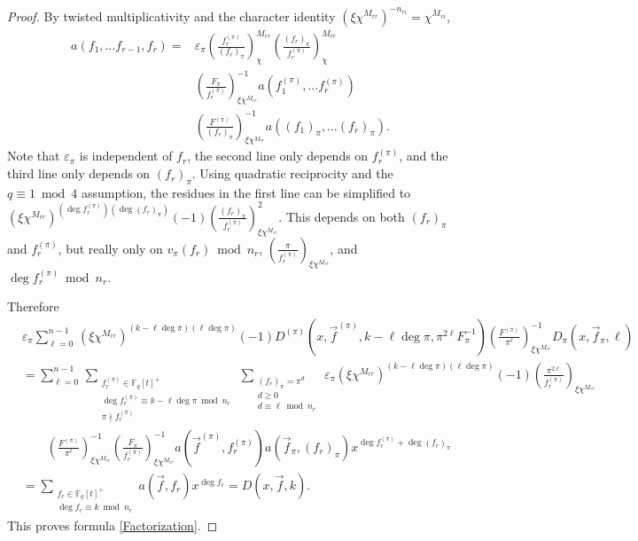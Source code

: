 \documentclass[11pt,letterpaper]{article}
\theoremstyle{definition}
\theoremstyle{remark}
\numberwithin{equation}{section}
\theoremstyle{dotless}
\newcommand{\F}{\mathbb{F}}
\newcommand{\res}[2]{\left(\frac{#1}{#2}\right)}
\begin{document}
\begin{proof}
By twisted multiplicativity and the character identity $(\xi \chi^{M_{rr}})^{-n_{ri}} = \chi^{M_{ri}}$, 
\begin{equation} \label{RemovePrime}
\begin{split}
a(f_1, \ldots f_{r-1}, f_r) = & \varepsilon_\pi \res{f_r^{(\pi)}}{(f_r)_\pi}_{\chi}^{M_{rr}}\res{(f_r)_\pi}{f_r^{(\pi)}}_{\chi}^{M_{rr}} \\
&\res{F_\pi}{f_r^{(\pi)}}_{\xi \chi^{M_{rr}}}^{-1} a(f_1^{(\pi)}, \ldots f_r^{(\pi)}) \\
& \res{F^{(\pi)}}{(f_r)_\pi}_{\xi \chi^{M_{rr}}}^{-1} a((f_1)_\pi, \ldots (f_r)_\pi).
\end{split}
\end{equation}
Note that $\varepsilon_\pi$ is independent of $f_r$, the second line only depends on $f_r^{(\pi)}$, and the third line only depends on $(f_r)_\pi$. Using quadratic reciprocity and the $q \equiv 1 \bmod 4$ assumption, the residues in the first line can be simplified to $(\xi \chi^{M_{rr}})^{(\deg f_r^{(\pi)})(\deg (f_r)_\pi)}(-1) \res{(f_r)_\pi}{f_r^{(\pi)}}^2_{\xi \chi^{M_{rr}}}$. This depends on both $(f_r)_\pi$ and $f_r^{(\pi)}$, but really only on $v_{\pi}(f_r) \bmod n_r$, $\res{\pi}{f_r^{(\pi)}}_{\xi \chi^{M_{rr}}}$, and $\deg f_r^{(\pi)} \bmod n_r$.

Therefore 
\begin{equation*}
\begin{split}
&\varepsilon_\pi \sum_{\ell=0}^{n-1} \, (\xi \chi^{M_{rr}})^{(k-\ell\deg \pi)(\ell \deg \pi)} (-1) D^{(\pi)}(x, \vec{f}^{(\pi)}, k-\ell \deg \pi, \pi^{2 \ell} F_\pi^{-1}) \res{F^{(\pi)}}{\pi^\ell}_{\xi \chi^{M_{rr}}}^{-1} D_\pi(x, \vec{f}_\pi, \ell) \\
& =\sum_{\ell=0}^{n-1} \, \sum_{\substack{ f_r^{(\pi)} \in \F_q[t]^+ \\ \deg f_r^{(\pi)} \equiv k-\ell \deg \pi \bmod n_r \\ \pi \nmid f_r^{(\pi)}}} \, \sum_{\substack{(f_r)_\pi = \pi^d \\ d\geq 0 \\ d \equiv \ell \bmod n_r}} \, \varepsilon_\pi (\xi \chi^{M_{rr}})^{(k-\ell\deg \pi)(\ell \deg \pi)} (-1) \res{\pi^{2\ell}}{f_r^{(\pi)}}_{\xi \chi^{M_{rr}}} \\ 
& \qquad \res{F^{(\pi)}}{\pi^\ell}_{\xi \chi^{M_{rr}}}^{-1} \res{F_\pi}{f_r^{(\pi)}}_{\xi \chi^{M_{rr}}}^{-1} a(\vec{f}^{(\pi)}, f_r^{(\pi)}) a(\vec{f}_\pi, (f_r)_\pi) x^{\deg f_r^{(\pi)}+\deg (f_r)_\pi}\\
&= \sum_{\substack{f_r \in \F_q[t]^+ \\ \deg f_r \equiv k \bmod n_r}} a(\vec{f}, f_r) x^{\deg f_r} = D(x, \vec{f}, k).
\end{split}
\end{equation*}
This proves formula \eqref{Factorization}.
\end{proof}
\end{document}
